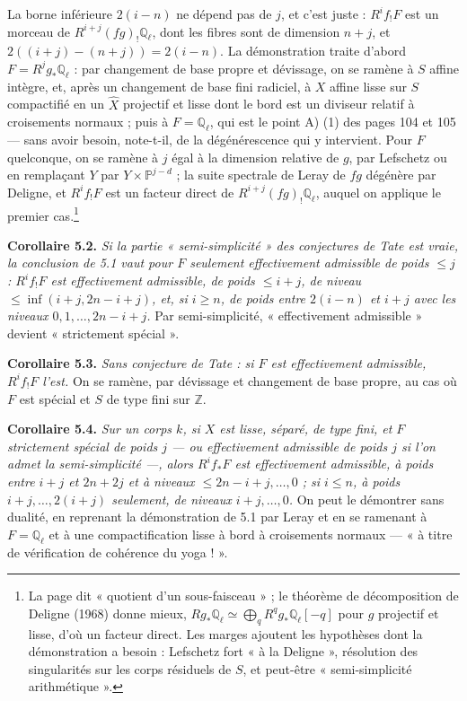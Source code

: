 \documentclass[11pt,a4paper]{article}
\begin{document}
La borne inférieure $2(i-n)$ ne dépend pas de $j$, et c'est juste : $R^{i}f_{!}F$
est un morceau de $R^{i+j}(fg)_{!}\mathbb{Q}_{\ell}$, dont les fibres sont de
dimension $n + j$, et $2((i+j) - (n+j)) = 2(i-n)$. La démonstration traite d'abord
$F = R^{j}g_{*}\mathbb{Q}_{\ell}$ : par changement de base propre et dévissage, on se
ramène à $S$ affine intègre, et, après un changement de base fini radiciel, à $X$
affine lisse sur $S$ compactifié en un $\widehat{X}$ projectif et lisse dont le bord
est un diviseur relatif à croisements normaux ; puis à $F = \mathbb{Q}_{\ell}$, qui
est le point A) (1) des pages 104 et 105 --- sans avoir besoin, note-t-il, de la
dégénérescence qui y intervient. Pour $F$ quelconque, on se ramène à $j$ égal à la
dimension relative de $g$, par Lefschetz ou en remplaçant $Y$ par $Y \times
\mathbb{P}^{j-d}$ ; la suite spectrale de Leray de $fg$ dégénère par Deligne, et
$R^{i}f_{!}F$ est un facteur direct de $R^{i+j}(fg)_{!}\mathbb{Q}_{\ell}$, auquel on
applique le premier cas.\footnote{La page dit « quotient d'un sous-faisceau » ;
le théorème de décomposition de Deligne (1968) donne mieux, $Rg_{*}\mathbb{Q}_{\ell}
\simeq \bigoplus_{q} R^{q}g_{*}\mathbb{Q}_{\ell}[-q]$ pour $g$ projectif et lisse,
d'où un facteur direct. Les marges ajoutent les hypothèses dont la démonstration a
besoin : Lefschetz fort « à la Deligne », résolution des singularités sur les corps
résiduels de $S$, et peut-être « semi-simplicité arithmétique ».}

\textbf{Corollaire 5.2.} \emph{Si la partie « semi-simplicité » des conjectures de
Tate est vraie, la conclusion de 5.1 vaut pour $F$ seulement effectivement
admissible de poids $\leqslant j$ : $R^{i}f_{!}F$ est effectivement admissible, de
poids $\leqslant i+j$, de niveau $\leqslant \inf(i+j, 2n-i+j)$, et, si $i \geqslant n$,
de poids entre $2(i-n)$ et $i+j$ avec les niveaux $0, 1, \ldots, 2n-i+j$.} Par
semi-simplicité, « effectivement admissible » devient « strictement spécial ».

\textbf{Corollaire 5.3.} \emph{Sans conjecture de Tate : si $F$ est effectivement
admissible, $R^{i}f_{!}F$ l'est.} On se ramène, par dévissage et changement de base
propre, au cas où $F$ est spécial et $S$ de type fini sur $\mathbb{Z}$.

\textbf{Corollaire 5.4.} \emph{Sur un corps $k$, si $X$ est lisse, séparé, de type
fini, et $F$ strictement spécial de poids $j$ --- ou effectivement admissible de
poids $j$ si l'on admet la semi-simplicité ---, alors $R^{i}f_{*}F$ est
effectivement admissible, à poids entre $i+j$ et $2n+2j$ et à niveaux $\leqslant
2n-i+j, \ldots, 0$ ; si $i \leqslant n$, à poids $i+j, \ldots, 2(i+j)$ seulement, de
niveaux $i+j, \ldots, 0$.} On peut le démontrer sans dualité, en reprenant la
démonstration de 5.1 par Leray et en se ramenant à $F = \mathbb{Q}_{\ell}$ et à une
compactification lisse à bord à croisements normaux --- « à titre de vérification
de cohérence du yoga ! ».
\end{document}
